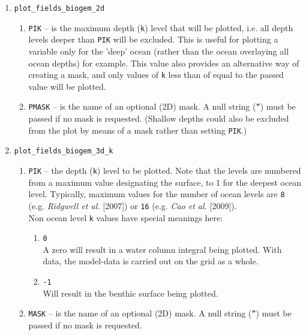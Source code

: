 \documentclass[11pt,fleqn]{book} %
\begin{document}
\begin{enumerate}

\vspace{2pt}
\item \texttt{plot\_fields\_biogem\_2d}
\begin{enumerate}
\item \texttt{PIK} -- is the maximum depth (\texttt{k}) level that will be plotted, i.e. all depth levels deeper than \texttt{PIK} will be excluded. This is useful for plotting a variable only for the 'deep' ocean (rather than the ocean overlaying all ocean depths) for example. This value also provides an alternative way of creating a mask, and only values of \texttt{k} less than of equal to the passed value will be plotted.
\item \texttt{PMASK} -- is the name of an optional (2D) mask. A null string (\texttt{''}) must be passed if no mask is requested. (Shallow depths could also be excluded from the plot by means of a mask rather than setting \texttt{PIK}.)
\end{enumerate}

\vspace{2pt}
\item \texttt{plot\_fields\_biogem\_3d\_k}
\begin{enumerate}
\item \texttt{PIK} -- the depth (\texttt{k}) level to be plotted. Note that the levels are numbered from a maximum value designating the surface, to 1 for the deepest ocean level. Typically, maximum values for the number of ocean levels are \texttt{8} (e.g. \textit{Ridgwell et al.} [2007]) or \texttt{16} (e.g. \textit{Cao et al.} [2009]).
\\Non ocean level \texttt{k} values have special meanings here:
\begin{enumerate}[noitemsep]
\item \texttt{0}
\\A zero will result in a water column integral being plotted. With data, the model-data is  carried out on the grid as a whole.
\item \texttt{-1}
\\Will result in the benthic surface being plotted.
\end{enumerate}
\item \texttt{MASK} -- is the name of an optional (2D) mask. A null string (\texttt{''}) must be passed if no mask is requested.
\end{enumerate}


\end{enumerate}
\end{document}
